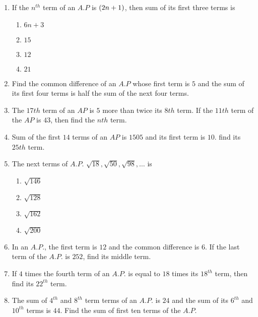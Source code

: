 \begin{enumerate}
\item If the $n^{th}$ term of an $A.P$ is $\left(2n+1\right)$, then sum of its first three terms is\\
\begin{enumerate}
\item $6n + 3$\\
\item $15$\\
\item $12$\\
\item $21$\\
\end{enumerate}
\item Find the common difference of an $A.P$ whose first term is $5$ and the sum of its first four terms is half the sum of the next four terms.\\
\item The $17th$ term of an $AP$ is $5$ more than twice its $8th$ term. If the $11th$ term of the $AP$ is $43$, then find the $nth$ term.\\

\item Sum of the first $14$ terms of an $AP$ is $1505$ and its first term is $10$. find its $25th$ term.\\
\item The next terms of $A.P.$ $\sqrt {18}, \sqrt {50}, \sqrt {98}, \ldots$ is\\
\begin{enumerate}
\item $\sqrt {146}$\\
\item $\sqrt {128}$\\
\item $\sqrt {162}$\\
\item $\sqrt {200}$\\
\end{enumerate}
\item In an $A.P.$, the first term is $12$ and the common difference is $6$. If the last term of the $A.P.$ is $252$, find its middle term.\\
\item If $4$ times the fourth term of an $A.P.$ is equal to $18$ times its $18^{th}$ term, then find its $22^{th}$ term.\\
\item The sum of $4^{th}$ and $8^{th}$ term terms of an $A.P.$ is $24$ and the sum of its $6^{th}$ and $10^{th}$ terms is $44$. Find the sum of first ten terms of the $A.P.$\\
\end{enumerate}
